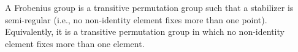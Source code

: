 A Frobenius group is a transitive permutation group such that a stabilizer is semi-regular (i.e., no non-identity element fixes more than one point). Equivalently, it is a transitive permutation group in which no non-identity element fixes more than one element.
